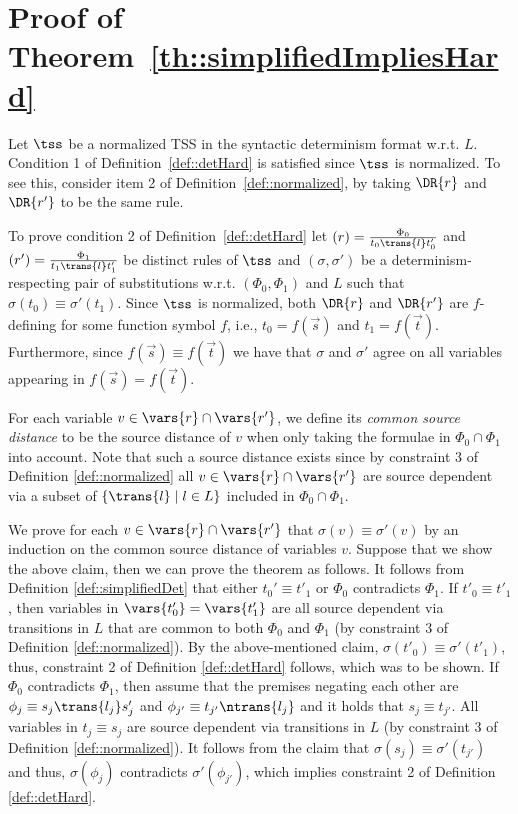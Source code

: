 \section{Proof of Theorem~\ref{th::simplifiedImpliesHard}}
\label{proof::simpImpHard}

Let $\tss$ be a normalized TSS in the syntactic determinism format w.r.t. $L$.
Condition 1
of Definition~\ref{def::detHard} is satisfied since $\tss$ is normalized. To
see this, consider item 2 of Definition~\ref{def::normalized}, by taking $\DR{r}$ and $\DR{r'}$ to be the same rule.

To prove condition 2 of Definition~\ref{def::detHard}
let $(r) = \frac{\Phi_0}{t_0\trans{l}t_0'}$ and
$(r') = \frac{\Phi_1}{t_1\trans{l}t_1'}$ be distinct rules of $\tss$ and $(\sigma,\sigma')$
be a determinism-respecting pair of substitutions w.r.t. $(\Phi_0, \Phi_1)$ and $L$
such that $\sigma(t_0) \equiv \sigma'(t_1)$. Since $\tss$ is normalized,
both $\DR{r}$ and $\DR{r'}$ are $f$-defining for some function symbol $f$, i.e., $t_0 = f(\overrightarrow{s})$
and $t_1 = f(\overrightarrow{t})$.
Furthermore, since $f(\overrightarrow{s}) \equiv f(\overrightarrow{t})$ we have that
$\sigma$ and $\sigma'$
agree on all variables appearing
in $f(\overrightarrow{s}) = f(\overrightarrow{t})$.

For each variable $v \in \vars{r} \cap \vars{r'}$, we define
its {\em common source distance} to be the source distance of $v$
when only taking the formulae in $\Phi_0 \cap \Phi_1$ into account.
Note that such a source distance exists since by constraint 3 of Definition \ref{def::normalized}
all $v \in \vars{r} \cap \vars{r'}$ are source dependent via a subset of $\{ \trans{l} \mid l \in  L\}$ included in $\Phi_0 \cap \Phi_1$.

We prove for each $v \in \vars{r} \cap \vars{r'}$ that $\sigma(v) \equiv \sigma'(v)$ by
an induction on the common source distance of variables $v$.
Suppose that we show the above claim, then we can prove the theorem as follows.
It follows from Definition \ref{def::simplifiedDet} that either $t_0' \equiv t'_1$ or $\Phi_0$ contradicts $\Phi_1$.
If $t'_0 \equiv t'_1$, then variables in $\vars{t'_0} = \vars{t'_1}$ are all source dependent via transitions in $L$
that are common to both $\Phi_0$ and $\Phi_1$
(by constraint 3 of Definition \ref{def::normalized}).
By the above-mentioned claim, $\sigma(t'_0) \equiv \sigma'(t'_1)$, thus, constraint 2 of Definition \ref{def::detHard} follows, which was to be shown.
If  $\Phi_0$ contradicts $\Phi_1$, then assume that the premises negating each other are $\phi_j \equiv s_j \trans{l_j} s'_j$ and $\phi_{j'} \equiv t_{j'} \ntrans{l_j}$ and it holds that $s_j \equiv t_{j'}$.
All variables in $t_j \equiv s_j$ are source dependent via transitions in $L$ (by constraint 3   of Definition \ref{def::normalized}).
It follows from the claim that $\sigma(s_j) \equiv \sigma'(t_{j'})$
and thus, $\sigma(\phi_j)$ contradicts $\sigma'(\phi_{j'})$, which implies constraint 2 of Definition \ref{def::detHard}.



